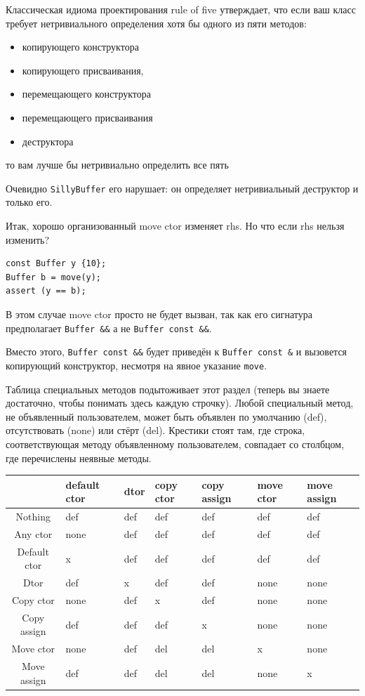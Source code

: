 \documentclass[a4paper,12pt,oneside]{article}
\begin{document}
Классическая идиома проектирования rule of five утверждает, что если ваш класс требует нетривиального определения хотя бы одного из пяти методов:

\begin{itemize} 
\item копирующего конструктора
\item копирующего присваивания,
\item перемещающего конструктора
\item перемещающего присваивания 
\item деструктора
\end{itemize} 

то вам лучше бы нетривиально определить все пять

Очевидно \lstinline!SillyBuffer! его нарушает: он определяет нетривиальный деструктор и только его.

Итак, хорошо организованный move ctor изменяет rhs. Но что если rhs нельзя изменить?

\begin{lstlisting}
const Buffer y {10};
Buffer b = move(y);
assert (y == b); 
\end{lstlisting}

В этом случае move ctor просто не будет вызван, так как его сигнатура предполагает \lstinline!Buffer &&! а не \lstinline!Buffer const &&!.

Вместо этого, \lstinline!Buffer const &&! будет приведён к \lstinline!Buffer const &! и вызовется копирующий конструктор, несмотря на явное указание \lstinline!move!.

Таблица специальных методов подытоживает этот раздел (теперь вы знаете достаточно, чтобы понимать здесь каждую строчку). Любой специальный метод, не объявленный пользователем, может быть объявлен по умолчанию (def), отсутствовать (none) или стёрт (del). Крестики стоят там, где строка, соответствующая методу объявленному пользователем, совпадает со столбцом, где перечислены неявные методы.

\begin{center}
  \begin{tabular}{ | c | p{1cm} | p{1cm} | p{1cm} | p{1cm} | p{1cm} | p{1cm} | }
    \hline
     & default ctor & dtor & copy ctor & copy assign & move ctor & move assign \\ \hline \hline
    Nothing & def & def & def & def & def & def \\ \hline
    Any ctor & none & def & def & def & def & def \\ \hline
    Default ctor & x & def & def & def & def & def \\ \hline
    Dtor & def & x & def & def & none & none \\ \hline
    Copy ctor & none & def & x & def & none & none \\ \hline
    Copy assign & def & def & def & x & none & none \\ \hline
    Move ctor & none & def & del & del & x & none \\ \hline
    Move assign & def & def & del & del & none & x \\ \hline
  \end{tabular}
\end{center}
\end{document}
